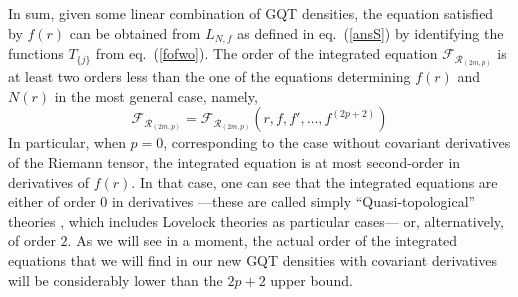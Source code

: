 \documentclass[11pt]{article}
\newcommand{\req}[1]{(\ref{#1})} %
\renewcommand{\req}[1]{eq.~(\ref{#1})}
\newcommand{\comment}[1]{{\bf [[[#1]]]}}
\begin{document}
{In sum, given some linear combination of GQT densities, the equation satisfied by $f(r)$ can be obtained from  $L_{N,f}$ as defined in \req{ansS} by identifying the functions $T_{\{ j \}}$ from \req{fofwo}. The order of the integrated equation $\mathcal{F}_{\mathcal{R}_{(2m,p)}} $ is at least two orders less than the one of the equations determining $f(r)$ and $N(r)$ in the most general case, namely, 
\begin{equation}
\mathcal{F}_{\mathcal{R}_{(2m,p)}}=\mathcal{F}_{\mathcal{R}_{(2m,p)}}(r,f,f',\dots,f^{(2p+2)})
\end{equation}
In particular, when $p=0$, corresponding to the case without covariant derivatives of the Riemann tensor, the integrated equation is at most second-order in derivatives of $f(r)$. In that case, one can see that the integrated equations are either of order $0$ in derivatives ---these are called simply ``Quasi-topological'' theories \cite{Quasi2,Quasi,Dehghani:2011vu,Ahmed:2017jod,Cisterna:2017umf}, which includes Lovelock theories \cite{Lovelock1,Lovelock2} as particular cases--- or, alternatively, of order $2$.  As we will see in a moment, the actual order of the integrated equations that we will find in our new GQT densities with covariant derivatives will be considerably lower than the $2p+2$ upper bound.


 
}
\end{document}
